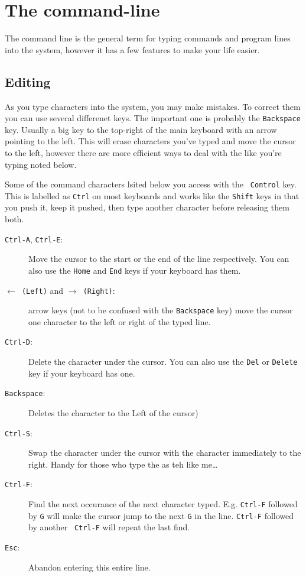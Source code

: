 \chapter{The command-line}
The command line is the general term for typing commands and 
program lines into the system, however it has a few features to
make your life easier.

\section{Editing}
As you type characters into the system, you may make mistakes. To correct
them you can use several differenet keys. The important one is probably
the {\tt Backspace} key. Usually a big key to the top-right of the main
keyboard with an arrow pointing to the left. This will erase characters
you've typed and move the cursor to the left, however there are more
efficient ways to deal with the like you're typing noted below.

Some of  the command characters lsited below you access with the {\tt
Control} key. This is labelled as {\tt Ctrl} on most keyboards and
works like the {\tt Shift} keys in that you push it, keep it pushed,
then type another character before releasing them both.

\begin{description}
\item[{\tt Ctrl-A}, {\tt Ctrl-E}:] Move the cursor to the start or the
end of the line respectively. You can also use the {\tt Home} and {\tt End}
keys if your keyboard has them.
\item[{\tt $\leftarrow$ (Left)} and {\tt $\rightarrow$ (Right)}:] arrow
keys (not to be confused with the {\tt Backspace} key) move the cursor
one character to the left or right of the typed line.
\item[{\tt Ctrl-D}:] Delete the character under the cursor. You can also
use the {\tt Del} or {\tt Delete} key if your keyboard has one.
\item[{\tt Backspace}:] Deletes the character to the Left of the cursor)
\item[{\tt Ctrl-S}:] Swap the character under the cursor with the character
immediately to the right. Handy for those who type the as teh like me\dots
\item[{\tt Ctrl-F}:] Find the next occurance of the next character typed.
E.g. {\tt Ctrl-F} followed by {\tt G} will make the cursor jump to
the next {\tt G} in the line. {\tt Ctrl-F} followed by another {\tt
Ctrl-F} will repeat the last find. 
\item[{\tt Esc}:] Abandon entering this entire line.
\end{description}

